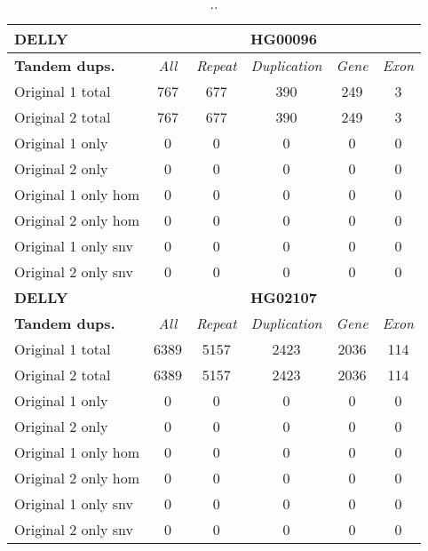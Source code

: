 \begin{table}[htb]
\begin{center}
\begin{tabular}{|l|c||c|c|c|c|}
\hline
{\bf DELLY} & \multicolumn{5}{|c|}{\bf HG00096} \\
\hline
\cline{2-6}
{\bf Tandem dups.} & {\it All} & {\it Repeat} & {\it Duplication} & {\it Gene} & {\it Exon} \\
\hline
Original 1 total & 767 & 677 & 390 & 249 & 3\\ 
\hline
Original 2 total & 767 & 677 & 390 & 249 & 3\\ 
\hline
Original 1 only & 0 & 0 & 0 & 0 & 0\\ 
\hline
Original 2 only & 0 & 0 & 0 & 0 & 0\\ 
\hline
Original 1 only hom & 0 & 0 & 0 & 0 & 0\\ 
\hline
Original 2 only hom & 0 & 0 & 0 & 0 & 0\\ 
\hline
Original 1 only snv & 0 & 0 & 0 & 0 & 0\\ 
\hline
Original 2 only snv & 0 & 0 & 0 & 0 & 0\\ 
\hline
\hline
{\bf DELLY} & \multicolumn{5}{|c|}{\bf HG02107} \\
\hline
\cline{2-6}
{\bf Tandem dups.} & {\it All} & {\it Repeat} & {\it Duplication} & {\it Gene} & {\it Exon} \\
\hline
Original 1 total & 6389 & 5157 & 2423 & 2036 & 114\\ 
\hline
Original 2 total & 6389 & 5157 & 2423 & 2036 & 114\\ 
\hline
Original 1 only & 0 & 0 & 0 & 0 & 0\\ 
\hline
Original 2 only & 0 & 0 & 0 & 0 & 0\\ 
\hline
Original 1 only hom & 0 & 0 & 0 & 0 & 0\\ 
\hline
Original 2 only hom & 0 & 0 & 0 & 0 & 0\\ 
\hline
Original 1 only snv & 0 & 0 & 0 & 0 & 0\\ 
\hline
Original 2 only snv & 0 & 0 & 0 & 0 & 0\\ 
\hline
\end{tabular}
\end{center}
\caption{ .. }
\label{tab:orig-vs-orig2-delly-dups}
\end{table}

